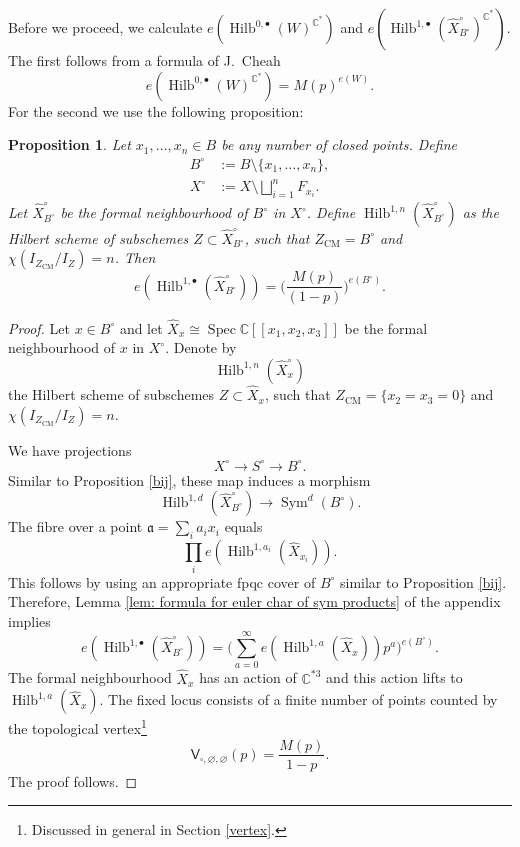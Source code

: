\documentclass{amsart}
\newtheorem{proposition}[theorem]{Proposition}
\theoremstyle{definition}
\newcommand{\CC} {\mathbb{C}}          %
\newcommand{\sfV}{\mathsf{V}}
\newcommand{\Sym}{\operatorname{Sym}}
\newcommand{\Hilb}{\operatorname{Hilb}}
\newcommand{\CM}{\operatorname{CM}}
\newcommand{\Spec}{\operatorname{Spec}}
\begin{document}
Before we proceed, we calculate $e(\Hilb^{0,\bullet}(W)^{\CC^*})$ and $e(\Hilb^{1,\bullet}(\widehat{X}^{\circ}_{B^{\circ}})^{\CC^*})$. The first follows from a formula of J.~Cheah \cite{Che} 
\begin{equation} \label{Cheah}
e(\Hilb^{0,\bullet}(W)^{\CC^*}) = M(p)^{e(W)}.
\end{equation}
For the second we use the following proposition:
\begin{proposition} \label{section}
Let $x_1, \ldots, x_n \in B$ be any number of closed points. Define 
\begin{align*}
B^\circ &:= B \setminus \{x_1, \ldots, x_n\}, \\
X^\circ &:= X \setminus \bigsqcup_{i=1}^{n} F_{x_i}.
\end{align*} 
Let $\widehat{X}^{\circ}_{B^{\circ}}$ be the formal neighbourhood of $B^\circ$ in $X^\circ$. Define $\Hilb^{1,n}(\widehat{X}^{\circ}_{B^{\circ}})$ as the Hilbert scheme of subschemes $Z \subset \widehat{X}^{\circ}_{B^{\circ}}$, such that $Z_{\CM} = B^\circ$ and $\chi(I_{Z_{\CM}} / I_Z) = n$.
Then
$$
e(\Hilb^{1,\bullet}(\widehat{X}^{\circ}_{B^{\circ}})) = \Bigg( \frac{M(p)}{(1-p)} \Bigg)^{e(B^\circ)}.
$$
\end{proposition}
\begin{proof}
Let $x \in B^\circ$ and let $\widehat{X}_{x} \cong \Spec \CC [\![x_1,x_2,x_3]\!]$ be the formal neighbourhood of $x$ in $X^\circ$. Denote by $$\Hilb^{1,n}(\widehat{X}^{\circ}_{x})$$ the Hilbert scheme of subschemes $Z \subset \widehat{X}_{x}$, such that $Z_{\CM} = \{x_2=x_3=0\}$ and $\chi(I_{Z_{\CM}} / I_Z) = n$. 

We have projections
$$
X^\circ \longrightarrow S^\circ \longrightarrow B^\circ.
$$
Similar to Proposition \ref{bij}, these map induces a morphism
$$
\Hilb^{1,d}(\widehat{X}^{\circ}_{B^{\circ}}) \longrightarrow \Sym^d(B^\circ).
$$
The fibre over a point $\mathfrak{a} = \sum_i a_i x_i$ equals
$$
\prod_{i} e(\Hilb^{1,a_i}(\widehat{X}_{x_i})).
$$
This follows by using an appropriate fpqc cover of $B^\circ$ similar to Proposition \ref{bij}. Therefore, Lemma \ref{lem: formula for euler char of sym products} of the appendix implies
$$
e(\Hilb^{1,\bullet}(\widehat{X}^{\circ}_{B^{\circ}})) = \Bigg( \sum_{a=0}^{\infty} e(\Hilb^{1,a}(\widehat{X}_{x})) p^a \Bigg)^{e(B^\circ)}.
$$
The formal neighbourhood $\widehat{X}_{x}$ has an action of $\CC^{*3}$ and this action lifts to $\Hilb^{1,a}(\widehat{X}_{x})$. The fixed locus consists of a finite number of points counted by the topological vertex\footnote{Discussed in general in Section \ref{vertex}.}
$$
\sfV_{\square,\varnothing,\varnothing}(p) = \frac{M(p)}{1-p}.
$$
The proof follows.
\end{proof}
\end{document}
